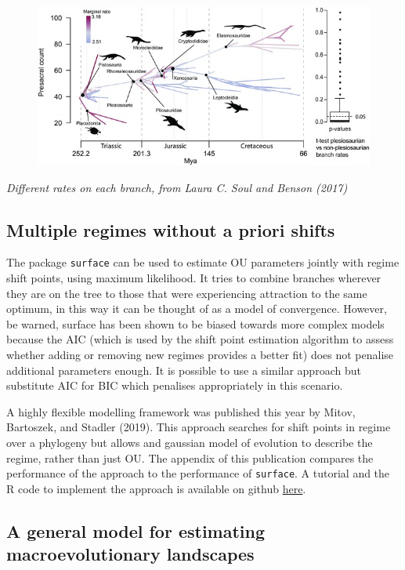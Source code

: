 \documentclass[]{article}
\begin{document}
\begin{figure}
\centering
\includegraphics{perBranchRate.jpg}
\caption{}
\end{figure}

\emph{Different rates on each branch, from Laura C. Soul and Benson
(2017) }

\subsection{Multiple regimes without a priori
shifts}\label{multiple-regimes-without-a-priori-shifts}

The package \texttt{surface} can be used to estimate OU parameters
jointly with regime shift points, using maximum likelihood. It tries to
combine branches wherever they are on the tree to those that were
experiencing attraction to the same optimum, in this way it can be
thought of as a model of convergence. However, be warned, surface has
been shown to be biased towards more complex models because the AIC
(which is used by the shift point estimation algorithm to assess whether
adding or removing new regimes provides a better fit) does not penalise
additional parameters enough. It is possible to use a similar approach
but substitute AIC for BIC which penalises appropriately in this
scenario.

A highly flexible modelling framework was published this year by Mitov,
Bartoszek, and Stadler (2019). This approach searches for shift points
in regime over a phylogeny but allows and gaussian model of evolution to
describe the regime, rather than just OU. The appendix of this
publication compares the performance of the approach to the performance
of \texttt{surface}. A tutorial and the R code to implement the approach
is available on github \href{https://venelin.github.io/PCMfit}{here}.

\subsection{A general model for estimating macroevolutionary
landscapes}\label{a-general-model-for-estimating-macroevolutionary-landscapes}
\end{document}
